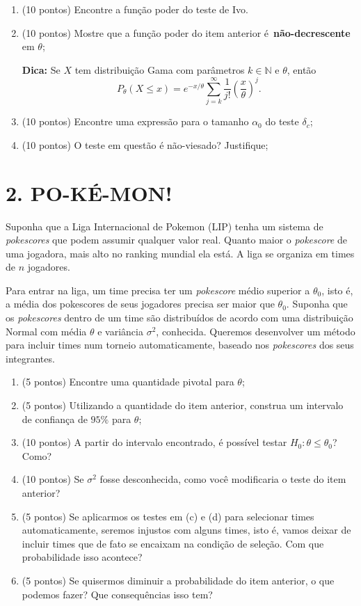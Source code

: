 \documentclass[a4paper,10pt, notitlepage]{report}
\newif\ifanswers
\begin{document}
\begin{enumerate}[label=\alph*)]
 \item (10 pontos) Encontre a função poder do teste de Ivo.
 \item (10 pontos) Mostre que a função poder do item anterior é~\textbf{não-decrescente} em $\theta$;
 
 \textbf{Dica:} Se $X$ tem distribuição Gama com parâmetros $k \in \mathbb{N}$ e $\theta$, então 
 \begin{equation*}
     P_\theta \left(X \leq x \right) = e^{-x/\theta}\sum_{j = k}^\infty \frac{1}{j!}\left(\frac{x}{\theta}\right)^j.
 \end{equation*}
 \item (10 pontos) Encontre uma expressão para o tamanho $\alpha_0$ do teste $\delta_c$;
 \item (10 pontos) O teste em questão é não-viesado? Justifique;
\end{enumerate}
\ifanswers

\fi

\section*{2. PO-KÉ-MON!} 

Suponha que a Liga Internacional de Pokemon (LIP) tenha um sistema de \textit{pokescores} que podem assumir qualquer valor real. 
Quanto maior o \textit{pokescore} de uma jogadora, mais alto no ranking mundial ela está.
A liga se organiza em times de $n$ jogadores.

Para entrar na liga, um time precisa ter um \textit{pokescore} médio superior a $\theta_0$, isto é, a média dos pokescores de seus jogadores precisa ser maior que $\theta_0$.
Suponha que os \textit{pokescores} dentro de um time são distribuídos de acordo com uma distribuição Normal com média $\theta$ e variância $\sigma^2$, conhecida.
Queremos desenvolver um método para incluir times num torneio automaticamente, baseado nos \textit{pokescores} dos seus integrantes.

\begin{enumerate}[label=\alph*)] 
 \item (5 pontos) Encontre uma quantidade pivotal para $\theta$;
 \item (5 pontos) Utilizando a quantidade do item anterior, construa um intervalo de confiança de $95\%$ para $\theta$;
 \item (10 pontos) A partir do intervalo encontrado, é possível testar $H_0: \theta \leq \theta_0$? Como?
 \item (10 pontos) Se $\sigma^2$ fosse desconhecida, como você modificaria o teste do item anterior?
 \item (5 pontos) Se aplicarmos os testes em (c) e (d) para selecionar times automaticamente, seremos injustos com alguns times, isto é, vamos deixar de incluir times que de fato se encaixam na condição de seleção.
 Com que probabilidade isso acontece?
 \item (5 pontos) Se quisermos diminuir a probabilidade do item anterior, o que podemos fazer? Que consequências isso tem?
\end{enumerate} 
\ifanswers

\fi
\end{document}
